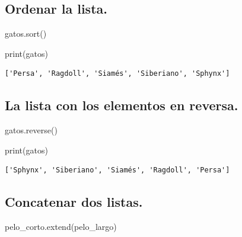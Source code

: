 \documentclass[
  spanish,
  letterpaper,
]{scrbook}
\newenvironment{Shaded}{\begin{snugshade}}{\end{snugshade}}
\newcommand{\BuiltInTok}[1]{\textcolor[rgb]{0.00,0.23,0.31}{#1}}
\newcommand{\NormalTok}[1]{\textcolor[rgb]{0.00,0.23,0.31}{#1}}
\theoremstyle{definition}
\theoremstyle{remark}
\begin{document}
\subsection{Ordenar la lista.}\label{ordenar-la-lista.}

\begin{Shaded}
\begin{Highlighting}[]
\NormalTok{gatos.sort() }
\end{Highlighting}
\end{Shaded}

\begin{Shaded}
\begin{Highlighting}[]
\BuiltInTok{print}\NormalTok{(gatos)}
\end{Highlighting}
\end{Shaded}

\begin{verbatim}
['Persa', 'Ragdoll', 'Siamés', 'Siberiano', 'Sphynx']
\end{verbatim}

\subsection{La lista con los elementos en
reversa.}\label{la-lista-con-los-elementos-en-reversa.}

\begin{Shaded}
\begin{Highlighting}[]
\NormalTok{gatos.reverse() }
\end{Highlighting}
\end{Shaded}

\begin{Shaded}
\begin{Highlighting}[]
\BuiltInTok{print}\NormalTok{(gatos)}
\end{Highlighting}
\end{Shaded}

\begin{verbatim}
['Sphynx', 'Siberiano', 'Siamés', 'Ragdoll', 'Persa']
\end{verbatim}

\subsection{Concatenar dos listas.}\label{concatenar-dos-listas.}

\begin{Shaded}
\begin{Highlighting}[]
\NormalTok{pelo\_corto.extend(pelo\_largo) }
\end{Highlighting}
\end{Shaded}
\end{document}
